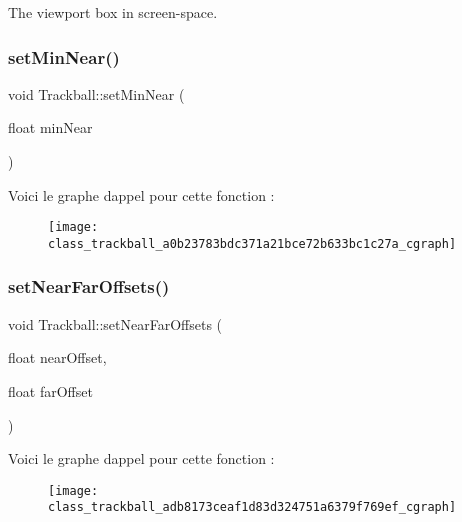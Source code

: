 The viewport box in screen-\/space. 

\mbox{\label{class_trackball_a0b23783bdc371a21bce72b633bc1c27a}} 
\subsubsection{\texorpdfstring{set\+Min\+Near()}{setMinNear()}}
{\footnotesize\ttfamily void Trackball\+::set\+Min\+Near (\begin{DoxyParamCaption}\item[{float}]{min\+Near }\end{DoxyParamCaption})}

Voici le graphe d\textquotesingle{}appel pour cette fonction \+:
\nopagebreak
\begin{figure}[H]
\begin{center}
\leavevmode
\texttt{[image: class\_trackball\_a0b23783bdc371a21bce72b633bc1c27a\_cgraph]}
\end{center}
\end{figure}
\mbox{\label{class_trackball_adb8173ceaf1d83d324751a6379f769ef}} 
\subsubsection{\texorpdfstring{set\+Near\+Far\+Offsets()}{setNearFarOffsets()}}
{\footnotesize\ttfamily void Trackball\+::set\+Near\+Far\+Offsets (\begin{DoxyParamCaption}\item[{float}]{near\+Offset,  }\item[{float}]{far\+Offset }\end{DoxyParamCaption})}

Voici le graphe d\textquotesingle{}appel pour cette fonction \+:
\nopagebreak
\begin{figure}[H]
\begin{center}
\leavevmode
\texttt{[image: class\_trackball\_adb8173ceaf1d83d324751a6379f769ef\_cgraph]}
\end{center}
\end{figure}
\mbox{\label{class_trackball_a279072f30b8e41189b05ce0a1caf36a0}} 
